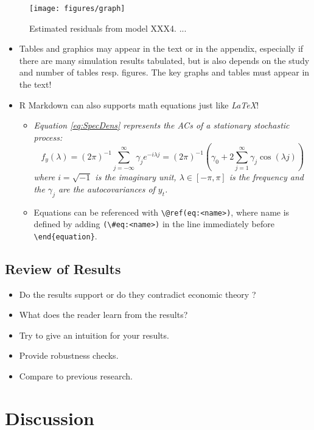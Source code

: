 \documentclass[11pt, a4paper, twosided]{book}
\begin{document}
\begin{figure}

{\centering \texttt{[image: figures/graph]} 

}

\caption{Estimated residuals from model XXX4. ...}\label{fig:graph4}
\end{figure}
\begin{itemize}
\item
  Tables and graphics may appear in the text or in the appendix, especially if
  there are many simulation results tabulated, but is also depends on the study
  and number of tables resp. figures. The key graphs and tables must appear in
  the text!
\item
  R Markdown can also supports math equations just like \emph{LaTeX}!
  \begin{itemize}
  \item
    \emph{Equation \eqref{eq:SpecDens} represents the ACs of a stationary
    stochastic process:}
    \begin{equation}
            f_y(\lambda) = (2\pi)^{-1} \sum_{j=-\infty}^{\infty}
                           \gamma_j e^{-i\lambda j}
                         =(2\pi)^{-1}\left(\gamma_0 + 2 \sum_{j=1}^{\infty}
        \gamma_j \cos(\lambda j)\right)
                                       \label{eq:SpecDens}
    \end{equation}
    \emph{where \(i=\sqrt{-1}\) is the imaginary unit, \(\lambda \in [-\pi, \pi]\) is the
    frequency and the \(\gamma_j\) are the autocovariances of \(y_t\).}
  \item
    Equations can be referenced with \texttt{\textbackslash{}@ref(eq:\textless{}name\textgreater{})}, where name is defined
    by adding \texttt{(\textbackslash{}\#eq:\textless{}name\textgreater{})} in the line immediately before \texttt{\textbackslash{}end\{equation\}}.
  \end{itemize}
\end{itemize}
\hypertarget{review-of-results}{%
\section{Review of Results}\label{review-of-results}}
\begin{itemize}
\item
  Do the results support or do they contradict economic theory ?
\item
  What does the reader learn from the results?
\item
  Try to give an intuition for your results.
\item
  Provide robustness checks.
\item
  Compare to previous research.
\end{itemize}
\hypertarget{discussion-3}{%
\chapter{Discussion}\label{discussion-3}}
\end{document}
